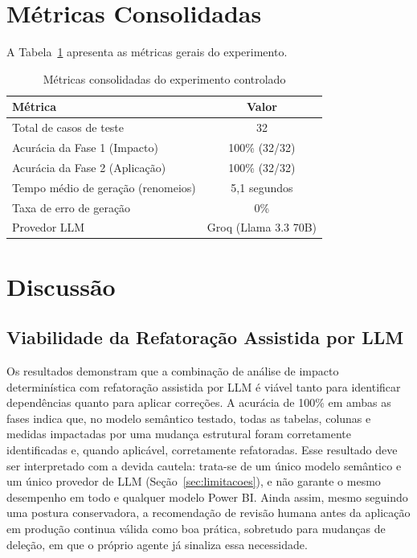 \documentclass[
    12pt,               %
    openright,          %
    oneside,            %
    a4paper,            %
    chapter=TITLE,      %
    section=TITLE,      %
    brazil              %
]{abntex2}
\begin{document}
\section{Métricas Consolidadas}

A Tabela~\ref{tab:metricas-consolidadas} apresenta as métricas gerais do experimento.

\begin{table}[H]
    \centering
    \caption{Métricas consolidadas do experimento controlado}
    \label{tab:metricas-consolidadas}
    \begin{tabularx}{\textwidth}{Xc}
        \toprule
        \textbf{Métrica} & \textbf{Valor} \\
        \midrule
        Total de casos de teste          & 32 \\
        Acurácia da Fase 1 (Impacto)     & 100\% (32/32) \\
        Acurácia da Fase 2 (Aplicação)   & 100\% (32/32) \\
        Tempo médio de geração (renomeios) & 5,1 segundos \\
        Taxa de erro de geração          & 0\% \\
        Provedor LLM                     & Groq (Llama 3.3 70B) \\
        \bottomrule
    \end{tabularx}
\end{table}

\section{Discussão}

\subsection{Viabilidade da Refatoração Assistida por LLM}

Os resultados demonstram que a combinação de análise de impacto determinística com refatoração assistida por LLM é viável tanto para identificar dependências quanto para aplicar correções. A acurácia de 100\% em ambas as fases indica que, no modelo semântico testado, todas as tabelas, colunas e medidas impactadas por uma mudança estrutural foram corretamente identificadas e, quando aplicável, corretamente refatoradas. Esse resultado deve ser interpretado com a devida cautela: trata-se de um único modelo semântico e um único provedor de LLM (Seção~\ref{sec:limitacoes}), e não garante o mesmo desempenho em todo e qualquer modelo Power BI. Ainda assim, mesmo seguindo uma postura conservadora, a recomendação de revisão humana antes da aplicação em produção continua válida como boa prática, sobretudo para mudanças de deleção, em que o próprio agente já sinaliza essa necessidade.
\end{document}
